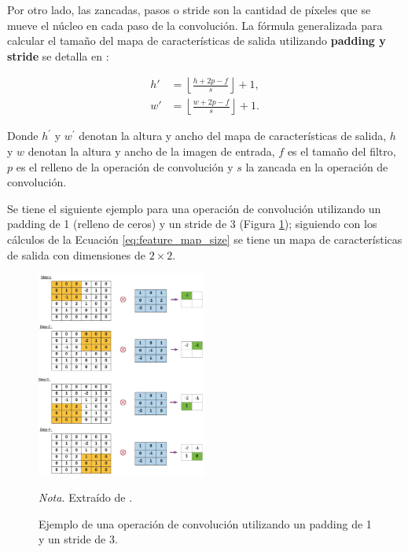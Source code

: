 Por otro lado, las zancadas, pasos o stride son la cantidad de píxeles que se mueve el núcleo en cada paso de la convolución. La fórmula generalizada para calcular el tamaño del mapa de características de salida utilizando 
\textbf{padding y stride} se detalla en \citet{balas_recent_2020}:

\begin{subequations}
    \label{eq:feature_map_size}
    \begin{align}
    h' &= \left\lfloor \frac{h + 2p - f}{s} \right\rfloor + 1,\\
    w' &= \left\lfloor \frac{w + 2p - f}{s} \right\rfloor + 1.
    \end{align}
\end{subequations}

Donde $h^{'}$ y $w^{'}$ denotan la altura y ancho del mapa de características de salida, $h$  y $w$ denotan la altura y ancho de la imagen de entrada, 
$f$ es el tamaño del filtro, $p$ es el relleno de la operación de convolución y $s$ la zancada en la operación de convolución.

Se tiene el siguiente ejemplo para una operación de convolución utilizando un padding de 1 (relleno de ceros)
y un stride de 3 (Figura \ref{fig:padding_stride}); siguiendo con los cálculos de la Ecuación \ref{eq:feature_map_size} se tiene un mapa de características 
de salida con dimensiones de $2\times2$.
\begin{figure}[H]
    \centering
    \caption{Ejemplo de una operación de convolución utilizando un padding de 1 y un stride de 3.}
    \includegraphics[width=0.5\textwidth]{img/4_marco_teorico/padding_stride.png}
    \label{fig:padding_stride}
    \begin{flushleft}
        \textit{Nota.} Extraído de \citet{balas_recent_2020}. 
        \vspace{-\baselineskip}       
    \end{flushleft}    
\end{figure}

